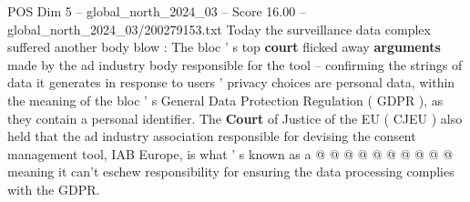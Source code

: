 \begin{textsample}{POS Dim 5 – global\_north\_2024\_03 – Score 16.00 – global\_north\_2024\_03/200279153.txt}
Today the surveillance data complex suffered another body blow : The bloc ' s top \textbf{court} flicked away \textbf{arguments} made by the ad industry body responsible for the tool -- confirming the strings of data it generates in response to users ' privacy choices are personal data, within the meaning of the bloc ' s General Data Protection Regulation ( GDPR ), as they contain a personal identifier.
The \textbf{Court} of Justice of the EU ( CJEU ) also held that the ad industry association responsible for devising the consent management tool, IAB Europe, is what ' s known as a @ @ @ @ @ @ @ @ @ @ meaning it can't eschew responsibility for ensuring the data processing complies with the GDPR.

\end{textsample}

